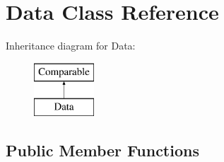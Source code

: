 \hypertarget{class_data}{}\section{Data Class Reference}
\label{class_data}
Inheritance diagram for Data\+:\begin{figure}[H]
\begin{center}
\leavevmode
\includegraphics[height=2.000000cm]{class_data}
\end{center}
\end{figure}
\subsection*{Public Member Functions}
